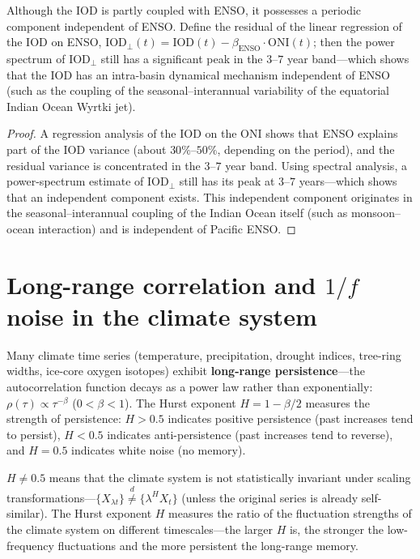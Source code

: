 \begin{proposition}\label{prop:iod_independence}
Although the IOD is partly coupled with ENSO, it possesses a periodic component independent of ENSO. Define the residual of the linear regression of the IOD on ENSO, $\text{IOD}_{\perp}(t) = \text{IOD}(t) - \beta_{\text{ENSO}} \cdot \text{ONI}(t)$; then the power spectrum of $\text{IOD}_{\perp}$ still has a significant peak in the $3$--$7$ year band---which shows that the IOD has an intra-basin dynamical mechanism independent of ENSO (such as the coupling of the seasonal--interannual variability of the equatorial Indian Ocean Wyrtki jet).
\end{proposition}

\begin{proof}
A regression analysis of the IOD on the ONI shows that ENSO explains part of the IOD variance (about $30\%$--$50\%$, depending on the period), and the residual variance is concentrated in the $3$--$7$ year band. Using spectral analysis, a power-spectrum estimate of $\text{IOD}_{\perp}$ still has its peak at $3$--$7$ years---which shows that an independent component exists. This independent component originates in the seasonal--interannual coupling of the Indian Ocean itself (such as monsoon--ocean interaction) and is independent of Pacific ENSO.
\end{proof}

\section{Long-range correlation and \texorpdfstring{$1/f$}{1/f} noise in the climate system}

\begin{definition}\label{def:climate_long_memory}
Many climate time series (temperature, precipitation, drought indices, tree-ring widths, ice-core oxygen isotopes) exhibit \textbf{long-range persistence}---the autocorrelation function decays as a power law rather than exponentially: $\rho(\tau) \propto \tau^{-\beta}$ ($0 < \beta < 1$). The Hurst exponent $H = 1 - \beta/2$ measures the strength of persistence: $H > 0.5$ indicates positive persistence (past increases tend to persist), $H < 0.5$ indicates anti-persistence (past increases tend to reverse), and $H = 0.5$ indicates white noise (no memory).

$H \neq 0.5$ means that the climate system is not statistically invariant under scaling transformations---$\{X_{\lambda t}\} \stackrel{d}{\neq} \{\lambda^H X_t\}$ (unless the original series is already self-similar). The Hurst exponent $H$ measures the ratio of the fluctuation strengths of the climate system on different timescales---the larger $H$ is, the stronger the low-frequency fluctuations and the more persistent the long-range memory.
\end{definition}

